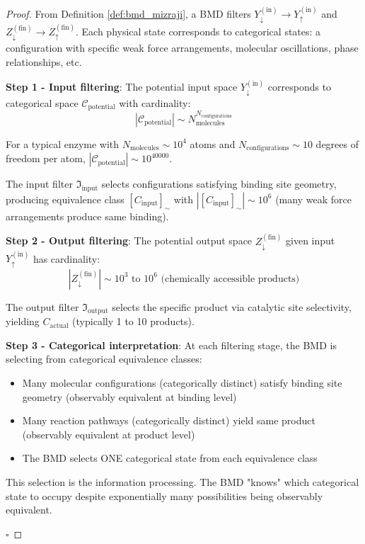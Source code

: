 \documentclass[12pt,a4paper]{article}
\begin{document}
\begin{proof}
From Definition \ref{def:bmd_mizraji}, a BMD filters $Y_{\downarrow}^{(\text{in})} \to Y_{\uparrow}^{(\text{in})}$ and $Z_{\downarrow}^{(\text{fin})} \to Z_{\uparrow}^{(\text{fin})}$. Each physical state corresponds to categorical states: a configuration with specific weak force arrangements, molecular oscillations, phase relationships, etc.

\textbf{Step 1 - Input filtering}: The potential input space $Y_{\downarrow}^{(\text{in})}$ corresponds to categorical space $\mathcal{C}_{\text{potential}}$ with cardinality:
\begin{equation}
|\mathcal{C}_{\text{potential}}| \sim N_{\text{molecules}}^{N_{\text{configurations}}}
\end{equation}

For a typical enzyme with $N_{\text{molecules}} \sim 10^4$ atoms and $N_{\text{configurations}} \sim 10$ degrees of freedom per atom, $|\mathcal{C}_{\text{potential}}| \sim 10^{40000}$.

The input filter $\Im_{\text{input}}$ selects configurations satisfying binding site geometry, producing equivalence class $[C_{\text{input}}]_{\sim}$ with $|[C_{\text{input}}]_{\sim}| \sim 10^6$ (many weak force arrangements produce same binding).

\textbf{Step 2 - Output filtering}: The potential output space $Z_{\downarrow}^{(\text{fin})}$ given input $Y_{\uparrow}^{(\text{in})}$ has cardinality:
\begin{equation}
|Z_{\downarrow}^{(\text{fin})}| \sim 10^3 \text{ to } 10^6 \text{ (chemically accessible products)}
\end{equation}

The output filter $\Im_{\text{output}}$ selects the specific product via catalytic site selectivity, yielding $C_{\text{actual}}$ (typically 1 to 10 products).

\textbf{Step 3 - Categorical interpretation}: At each filtering stage, the BMD is selecting from categorical equivalence classes:
\begin{itemize}
\item Many molecular configurations (categorically distinct) satisfy binding site geometry (observably equivalent at binding level)
\item Many reaction pathways (categorically distinct) yield same product (observably equivalent at product level)
\item The BMD selects ONE categorical state from each equivalence class
\end{itemize}

This selection is the information processing. The BMD "knows" which categorical state to occupy despite exponentially many possibilities being observably equivalent.

$\square$
\end{proof}
\end{document}
